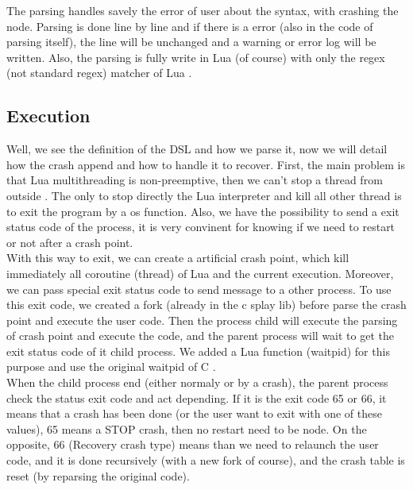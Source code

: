\documentclass{eplmastersthesis}
\begin{document}
          The parsing handles savely the error of user about the syntax, with crashing the node. Parsing is done
          line by line and if there is a error (also in the code of parsing itself), the line will be unchanged and
          a warning or error log will be written. Also, the parsing is fully write in Lua (of course) with only
          the regex (not standard regex) matcher of Lua \cite{RegexLua}.

        \subsection{Execution}

          Well, we see the definition of the DSL and how we parse it, now we will detail how the crash append and how
          to handle it to recover. First, the main problem is that Lua multithreading is non-preemptive, then we can't
          stop a thread from outside \cite{CoroutineLua}. The only to stop directly the Lua interpreter and kill all other
          thread is to exit the program by a os function. Also, we have the possibility to send a exit status code of the
          process, it is very convinent for knowing if we need to restart or not after a crash point. \\

          With this way to exit, we can create a artificial crash point, which kill immediately all coroutine (thread)
          of Lua and the current execution. Moreover, we can pass special exit status code to send message to a other process.
          To use this exit code, we created a fork (already in the c splay lib) before parse the crash point and execute the user code.
          Then the process child will execute the parsing of crash point and execute the code, and the parent process will wait
          to get the exit status code of it child process. We added a Lua function (waitpid) for this purpose and use the
          original waitpid of C \cite{waitpid}. \\

          When the child process end (either normaly or by a crash), the parent process check the status exit code and act depending.
          If it is the exit code 65 or 66, it means that a crash has been done (or the user want to exit with one of these values),
          65 means a STOP crash, then no restart need to be node. On the opposite, 66 (Recovery crash type) means than we need to
          relaunch the user code,
          and it is done recursively (with a new fork of course), and the crash table is reset (by reparsing the original code).
\end{document}
